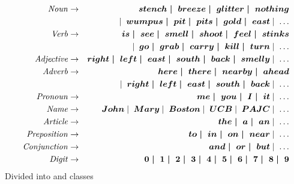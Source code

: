 \documentclass{article}
\begin{document}
\begin{huge}
\begin{eqnarray*}
{\it Noun} & \rightarrow & \mbox{\boldmath \( stench \mid\;breeze \mid\;glitter \mid\;nothing \)} \\
        & &\mid\; \mbox{\boldmath \( wumpus \mid\;pit \mid\;pits\mid\;gold \mid\;east \)} \mid\; \ldots \\
{\it Verb} & \rightarrow & \mbox{\boldmath \( is \mid\;see \mid\;smell \mid\;shoot \mid\;feel \mid\;stinks \)}\\
        & &\mid\; \mbox{\boldmath \( go \mid\;grab \mid\;carry \mid\;kill \mid\;turn \)} \mid\; \ldots \\
{\it Adjective} & \rightarrow & \mbox{\boldmath \( right \mid\;left \mid\;east \mid\;south \mid\;back \mid\;smelly \)} \mid\; \ldots \\
{\it Adverb} & \rightarrow & \mbox{\boldmath \( here \mid\;there \mid\;nearby \mid\;ahead \)} \\
        &&\mid\; \mbox{\boldmath \( right \mid\;left \mid\;east \mid\;south \mid\;back \)} \mid\; \ldots \\
{\it Pronoun} & \rightarrow & \mbox{\boldmath \( me \mid\;you \mid\;I \mid\;it \)} \mid\; \ldots \\
{\it Name} & \rightarrow & \mbox{\boldmath \( John \)} \mid\; \mbox{\boldmath \( Mary \)} \mid\; \mbox{\boldmath \( Boston \)}
	\mid\; \mbox{\boldmath \( UCB \)} \mid\; \mbox{\boldmath \( PAJC \)} \mid\; \ldots \\
{\it Article} & \rightarrow & \mbox{\boldmath \( the \mid\;a \mid\;an \)} \mid\; \ldots \\
{\it Preposition} & \rightarrow & \mbox{\boldmath \( to \mid\;in \mid\;on \mid\;near \)} \mid\; \ldots \\
{\it Conjunction} & \rightarrow & \mbox{\boldmath \( and \mid\;or \mid\;but \)} \mid\; \ldots \\
{\it Digit} & \rightarrow & \mbox{\boldmath \( 0\mid\;1\mid\;2\mid\;3\mid\;4\mid\;5\mid\;6\mid\;7\mid\;8\mid\;9 \)}
\end{eqnarray*}
Divided into  and  classes


\vspace*{-0.5in}


\end{huge}
\end{document}
